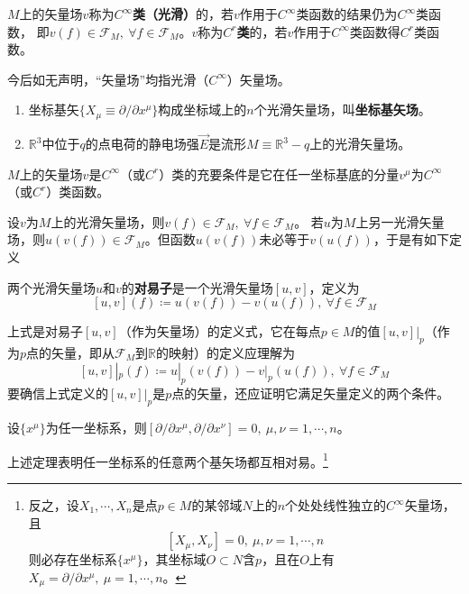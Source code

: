 \begin{definition}
$M$上的矢量场$v$称为\textbf{$C^\infty$类（光滑）}的，若$v$作用于$C^\infty$类函数的结果仍为$C^\infty$类函数，
即$v(f) \in \mathscr{F}_M, ~ \forall f \in \mathscr{F}_M$。$v$称为\textbf{$C^r$类}的，若$v$作用于$C^\infty$类函数得$C^r$类函数。
\end{definition}

今后如无声明，``矢量场''均指光滑（$C^\infty$）矢量场。

\begin{example}
\begin{enumerate}[（1）]
\item 坐标基矢$\{X_\mu \equiv \partial / \partial x^\mu\}$构成坐标域上的$n$个光滑矢量场，叫\textbf{坐标基矢场}。
\item $\mathbb{R}^3$中位于$q$的点电荷的静电场强$\vec{E}$是流形$M \equiv \mathbb{R}^3 - {q}$上的光滑矢量场。
\end{enumerate}
\end{example}

\begin{theorem}
$M$上的矢量场$v$是$C^\infty$（或$C^r$）类的充要条件是它在任一坐标基底的分量$v^\mu$为$C^\infty$（或$C^r$）类函数。
\end{theorem}

设$v$为$M$上的光滑矢量场，则$v(f) \in \mathscr{F}_M, ~ \forall f \in \mathscr{F}_M$。
若$u$为$M$上另一光滑矢量场，则$u(v(f)) \in \mathscr{F}_M$。但函数$u(v(f))$未必等于$v(u(f))$，于是有如下定义

\begin{definition}
两个光滑矢量场$u$和$v$的\textbf{对易子}是一个光滑矢量场$[u, v]$，定义为
$$[u, v](f) \coloneq u(v(f)) - v(u(f)), ~ \forall f \in \mathscr{F}_M$$
\end{definition}

\begin{note}
上式是对易子$[u, v]$（作为矢量场）的定义式，它在每点$p \in M$的值$[u, v]|_p$（作为$p$点的矢量，即从$\mathscr{F}_M$到$\mathbb{R}$的映射）的定义应理解为
$$[u, v]|_p(f) \coloneq u|_p(v(f)) - v|_p(u(f)), ~ \forall f \in \mathscr{F}_M$$
要确信上式定义的$[u, v]|_p$是$p$点的矢量，还应证明它满足矢量定义的两个条件。
\end{note}

\begin{theorem}
设$\{x^\mu\}$为任一坐标系，则$[\partial / \partial x^\mu, \partial / \partial x^\nu] = 0, ~ \mu,\nu = 1, \cdots, n$。
\end{theorem}

上述定理表明任一坐标系的任意两个基矢场都互相对易。\footnote{
反之，设$X_1, \cdots, X_n$是点$p \in M$的某邻域$N$上的$n$个处处线性独立的$C^\infty$矢量场，且
$$[X_\mu, X_\nu] = 0, ~ \mu, \nu = 1, \cdots, n$$
则必存在坐标系$\{x^\mu\}$，其坐标域$O \subset N$含$p$，且在$O$上有$X_\mu = \partial / \partial x^\mu, ~ \mu = 1, \cdots, n$。
}

